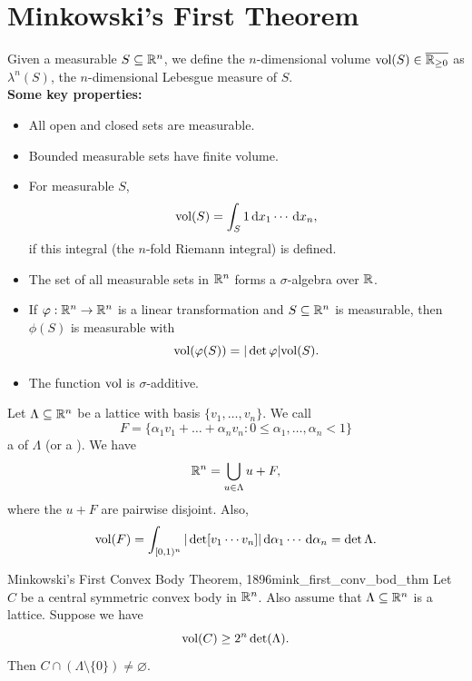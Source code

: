 \documentclass{Vorlesungstemplate_English} %
\begin{document}
  \section{Minkowski's First Theorem}
  Given a measurable $S \subseteq \mathbb{R}^n$, we define the $n$-dimensional volume $\text{vol}(S) \in \overline{\mathbb{R}_{\geq 0}}$ as $\lambda^n(S)$, the $n$-dimensional Lebesgue measure of $S$. \\
  \textbf{Some key properties:}
  \begin{itemize}
    \item All open and closed sets are measurable.
    \item Bounded measurable sets have finite volume.
    \item For measurable $S$,
    \[ \vol(S) = \int_S 1 \dl{x_1}\cdots\dl{x_n},\]
    if this integral (the $n$-fold Riemann integral) is defined.
    \item The set of all measurable sets in $\mathbb{R}^n$ forms a $\sigma$-algebra over $\mathbb{R}$.
     \item If $\varphi: \mathbb{R}^n \to \mathbb{R}^n$ is a linear transformation and $S \subseteq \mathbb{R}^n$ is measurable, then $\phi(S)$ is measurable with
     \[ \text{vol}(\varphi(S)) = |\det\varphi|\text{vol}(S).\]
     \item The function $\text{vol}$ is $\sigma$-additive.
  \end{itemize}
  Let $\Lambda \subseteq \mathbb{R}^n$ be a lattice with basis $\{ v_1, \dots, v_n\}$. We call
  \[ F = \{ \alpha_1v_1+ \dots + \alpha_nv_n: 0 \leq \alpha_1, \dots, \alpha_n < 1\}\]
   a  of $\Lambda$ (or a ). We have
  \[ \mathbb{R}^n = \bigcup_{u \in \Lambda} u+F,\]
  where the $u+F$ are pairwise disjoint. Also,
  \[ \vol(F) = \int_{[0,1)^n} |\det[v_1 \cdots v_n]|\dl{\alpha_1}\cdots\dl{\alpha_n} = \det\Lambda.\]
  \begin{theorem}{Minkowski's First Convex Body Theorem, 1896}{mink_first_conv_bod_thm}
    Let $C$ be a central symmetric convex body in $\mathbb{R}^n$. Also assume that $\Lambda \subseteq \mathbb{R}^n$ is a lattice. Suppose we have
    \[ \text{vol}(C) \geq 2^n\det(\Lambda).\]
    Then $C \cap (\Lambda \setminus \{ 0\}) \neq \varnothing$.
  \end{theorem}
\end{document}
